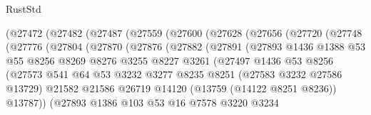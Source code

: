 \begin{lexlean}{RustStd}
\begin{coremodule}
              (@27472
                (@27482
                  (@27487
                    (@27559
                      (@27600
                        (@27628
                          (@27656
                            (@27720
                              (@27748
                                (@27776
                                  (@27804
                                    (@27870
                                      (@27876
                                        (@27882
                                          (@27891
                                            (@27893
                                              @1436
                                              @1388
                                              @53
                                              @55
                                              @8256
                                              @8269
                                              @8276
                                              @3255
                                              @8227
                                              @3261
                                              (@27497
                                                @1436
                                                @53
                                                @8256
                                                (@27573
                                                  @541
                                                  @64
                                                  @53
                                                  @3232
                                                  @3277
                                                  @8235
                                                  @8251
                                                  (@27583 @3232 @27586 @13729)
                                                  @21582
                                                  @21586
                                                  @26719
                                                  @14120
                                                  (@13759 (@14122 @8251 @8236))
                                                  @13787))
                                              (@27893
                                                @1386
                                                @103
                                                @53
                                                @16
                                                @7578
                                                @3220
                                                @3234

\end{coremodule}
\end{lexlean}
